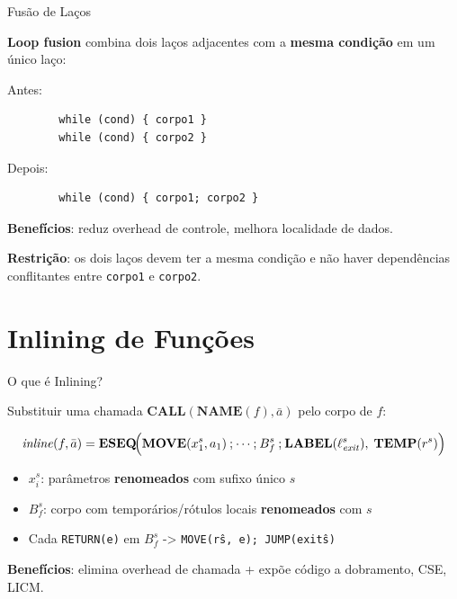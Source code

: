 \begin{frame}[fragile]{Fusão de Laços}

    \textbf{Loop fusion} combina dois laços adjacentes com a \textbf{mesma
    condição} em um único laço:

    Antes:

    \begin{lstlisting}
        while (cond) { corpo1 }
        while (cond) { corpo2 }
    \end{lstlisting}

    Depois:

    \begin{lstlisting}
        while (cond) { corpo1; corpo2 }
    \end{lstlisting}

    \textbf{Benefícios}: reduz overhead de controle, melhora localidade de
    dados.

    \textbf{Restrição}: os dois laços devem ter a mesma condição e não haver
    dependências conflitantes entre \texttt{corpo1} e
    \texttt{corpo2}.
\end{frame}


\section{Inlining de Funções}\label{inlining-de-funuxe7uxf5es}

\begin{frame}[fragile]{O que é Inlining?}

    Substituir uma chamada \(\mathbf{CALL}(\mathbf{NAME}(f), \bar{a})\) pelo
    corpo de \(f\):

    \[\mathit{inline}(f, \bar{a}) = \mathbf{ESEQ}\!\Bigl(\mathbf{MOVE}(x_1^s, a_1) \mathbin{;} \cdots \mathbin{;} B_f^s \mathbin{;} \mathbf{LABEL}(\ell_\mathit{exit}^s),\; \mathbf{TEMP}(r^s)\Bigr)\]

    \begin{itemize}

        \item
        \(x_i^s\): parâmetros \textbf{renomeados} com sufixo único \(s\)
        \item
        \(B_f^s\): corpo com temporários/rótulos locais \textbf{renomeados}
        com \(s\)
        \item
        Cada \texttt{RETURN(e)} em \(B_f^s\) ->
        \texttt{MOVE(r\^s, e); JUMP(exit\^s)}
    \end{itemize}

    \textbf{Benefícios}: elimina overhead de chamada + expõe código a
    dobramento, CSE, LICM.
\end{frame}

